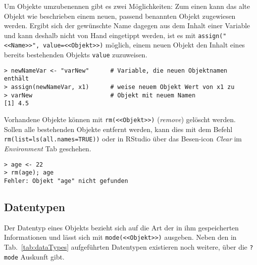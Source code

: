 Um Objekte umzubenennen gibt es zwei Möglichkeiten: Zum einen kann das alte Objekt wie beschrieben einem neuen, passend benannten Objekt zugewiesen werden. Ergibt sich der gewünschte Name dagegen aus dem Inhalt einer Variable und kann deshalb nicht von Hand eingetippt werden, ist es mit  \lstinline!assign("<<Name>>", value=<<Objekt>>)! möglich, einem neuen Objekt den Inhalt eines bereits bestehenden Objekts \lstinline!value! zuzuweisen.
\begin{lstlisting}
> newNameVar <- "varNew"      # Variable, die neuen Objektnamen enthält
> assign(newNameVar, x1)      # weise neuem Objekt Wert von x1 zu
> varNew                      # Objekt mit neuem Namen
[1] 4.5
\end{lstlisting}

Vorhandene Objekte können mit \lstinline!rm(<<Objekt>>)! (\emph{remove}) gelöscht werden. Sollen alle bestehenden Objekte entfernt werden, kann dies mit dem Befehl \lstinline!rm(list=ls(all.names=TRUE))! oder in RStudio über das Besen-icon \emph{Clear} im \emph{Environment} Tab geschehen.
\begin{lstlisting}
> age <- 22
> rm(age); age
Fehler: Objekt "age" nicht gefunden
\end{lstlisting}

\subsection{Datentypen}
\label{sec:dataTypes}

Der Datentyp eines Objekts bezieht sich auf die Art der in ihm gespeicherten Informationen und lässt sich mit \lstinline!mode(<<Objekt>>)! ausgeben. Neben den in Tab.\ \ref{tab:dataTypes} aufgeführten Datentypen existieren noch weitere, über die \lstinline!?mode! Auskunft gibt.

